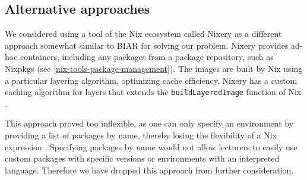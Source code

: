 \subsection{Alternative approaches}
We considered using a tool of the Nix ecosystem called Nixery as a different approach somewhat similar to BIAR for solving our problem. Nixery provides ad-hoc containers, including any packages from a package repository, such as Nixpkgs (see \ref{nix-tools-package-management}). The images are built by Nix using a particular layering algorithm, optimizing cache efficiency. Nixery has a custom caching algorithm for layers that extends the \verb|buildLayeredImage| function of Nix \cite{Nixery}. 

This approach proved too inflexible, as one can only specify an environment by providing a list of packages by name, thereby losing the flexibility of a Nix expression \cite{Nixery}. Specifying packages by name would not allow lecturers to easily use custom packages with specific versions or environments with an interpreted language. Therefore we have dropped this approach from further consideration. 

